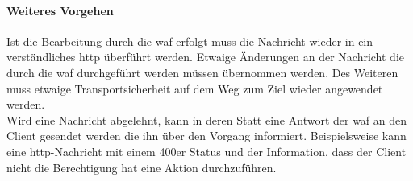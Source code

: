 \paragraph{Weiteres Vorgehen}
Ist die Bearbeitung durch die \ac{waf} erfolgt muss die Nachricht wieder in ein verständliches \ac{http} überführt werden.
Etwaige Änderungen an der Nachricht die durch die \ac{waf} durchgeführt werden müssen übernommen werden.
Des Weiteren muss etwaige Transportsicherheit auf dem Weg zum Ziel wieder angewendet werden.\\

Wird eine Nachricht abgelehnt, kann in deren Statt eine Antwort der \ac{waf} an den Client gesendet werden die ihn über den Vorgang informiert.
Beispielsweise kann eine \ac{http}-Nachricht mit einem 400er Status und der Information, dass der Client nicht die Berechtigung hat eine Aktion durchzuführen.



